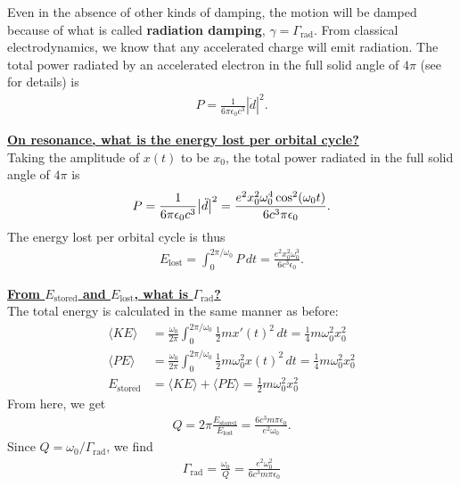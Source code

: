 \documentclass{book}
\theoremstyle{definition}
\newcommand{\f}[2]{\frac{#1}{#2}}
\begin{document}
Even in the absence of other kinds of damping, the motion will be damped because
of what is called \textbf{radiation damping}, $\gamma = \Gamma_{\text{rad}}$. From classical electrodynamics, we know that
any accelerated charge will emit radiation. The total power radiated by an accelerated
electron in the full solid angle of $4\pi$ (see \cite{griffiths2005introduction} for details) is 
\begin{align*}
P = \f{1}{6\pi \epsilon_0 c^3}|\ddot{d}|^2.
\end{align*}



\noindent \textbf{\underline{On resonance, what is the energy lost per orbital cycle?}}\\

Taking the amplitude of $x(t)$ to be $x_0$, the total power radiated in the full solid angle of $4\pi$ is 
\begin{align*}
P = \f{1}{6\pi \epsilon_0 c^3}\abs{\ddot d}^2 = \f{e^2 x_0^2 \omega_0^4 \cos^2(\omega_0 t)}{6 c^3 \pi \epsilon_0}.
\end{align*}
The energy lost per orbital cycle is thus
\begin{align*}
E_\text{lost} = \int_0^{2\pi/\omega_0} P\,dt = \f{e^2 x_0^2 \omega_0^3}{6c^3 \epsilon_0}.
\end{align*}



\noindent \textbf{\underline{From $E_\text{stored}$ and $E_\text{lost}$, what is $\Gamma_\text{rad}$? }}\\

The total energy is calculated in the same manner as before:
\begin{align*}
\langle KE\rangle &= \f{\omega_0}{2\pi} \int_0^{2\pi/\omega_0} \f{1}{2}m x'(t)^2\,dt= \f{1}{4}m \omega_0^2 x_0^2  \\
\langle PE \rangle &= \f{\omega_0}{2\pi}\int_0^{2\pi/\omega_0} \f{1}{2}m \omega_0^2 x(t)^2\,dt  = \f{1}{4}m \omega_0^2 x_0^2 \\
E_\text{stored} &= \langle KE \rangle + \langle PE \rangle = \f{1}{2}m \omega_0^2 x_0^2
\end{align*}
From here, we get
\begin{align*}
Q = 2\pi \f{E_\text{stored}}{E_\text{lost}} = \f{6c^3 m\pi \epsilon_0}{e^2 \omega_0}.
\end{align*}
Since $Q = \omega_0 / \Gamma_{\text{rad}}$, we find
\begin{align*}
\boxed{\Gamma_\text{rad} = \f{\omega_0}{Q} = \f{e^2 \omega_0^2}{6c^3 m \pi \epsilon_0}}
\end{align*} 
\end{document}
